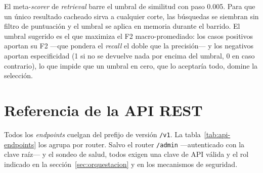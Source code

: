 El meta-\textit{scorer} de \textit{retrieval} barre el umbral de similitud con paso 0.005. Para que
un único resultado cacheado sirva a cualquier corte, las búsquedas se siembran sin filtro de
puntuación y el umbral se aplica en memoria durante el barrido. El umbral sugerido es el que
maximiza el F2 macro-promediado: los casos positivos aportan su F2 —que pondera el \textit{recall}
el doble que la precisión— y los negativos aportan especificidad (1 si no se devuelve nada por
encima del umbral, 0 en caso contrario), lo que impide que un umbral en cero, que lo aceptaría
todo, domine la selección.

\section{Referencia de la API REST}
\label{anx:api-reference}

Todos los \textit{endpoints} cuelgan del prefijo de versión \texttt{/v1}. La
tabla~\ref{tab:api-endpoints} los agrupa por router. Salvo el router \texttt{/admin} —autenticado
con la clave raíz— y el sondeo de salud, todos exigen una clave de \ac{API} válida y el rol indicado
en la sección~\ref{sec:orquestacion} y en los mecanismos de seguridad.

